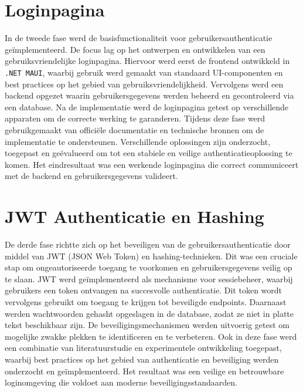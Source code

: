 \section{Loginpagina}

In de tweede fase werd de basisfunctionaliteit voor gebruikersauthenticatie geïmplementeerd. De focus lag op het ontwerpen en ontwikkelen van een gebruiksvriendelijke loginpagina. Hiervoor werd eerst de frontend ontwikkeld in \texttt{.NET MAUI}, waarbij gebruik werd gemaakt van standaard UI-componenten en best practices op het gebied van gebruiksvriendelijkheid. Vervolgens werd een backend opgezet waarin gebruikersgegevens werden beheerd en gecontroleerd via een database. Na de implementatie werd de loginpagina getest op verschillende apparaten om de correcte werking te garanderen. Tijdens deze fase werd gebruikgemaakt van officiële documentatie en technische bronnen om de implementatie te ondersteunen. Verschillende oplossingen zijn onderzocht, toegepast en geëvalueerd om tot een stabiele en veilige authenticatieoplossing te komen. Het eindresultaat was een werkende loginpagina die correct communiceert met de backend en gebruikersgegevens valideert.

\section{JWT Authenticatie en Hashing}

De derde fase richtte zich op het beveiligen van de gebruikersauthenticatie door middel van JWT (JSON Web Token) en hashing-technieken. Dit was een cruciale stap om ongeautoriseerde toegang te voorkomen en gebruikersgegevens veilig op te slaan. JWT werd geïmplementeerd als mechanisme voor sessiebeheer, waarbij gebruikers een token ontvangen na succesvolle authenticatie. Dit token wordt vervolgens gebruikt om toegang te krijgen tot beveiligde endpoints. Daarnaast werden wachtwoorden gehasht opgeslagen in de database, zodat ze niet in platte tekst beschikbaar zijn. De beveiligingsmechanismen werden uitvoerig getest om mogelijke zwakke plekken te identificeren en te verbeteren. Ook in deze fase werd een combinatie van literatuurstudie en experimentele ontwikkeling toegepast, waarbij best practices op het gebied van authenticatie en beveiliging werden onderzocht en geïmplementeerd. Het resultaat was een veilige en betrouwbare loginomgeving die voldoet aan moderne beveiligingsstandaarden.

